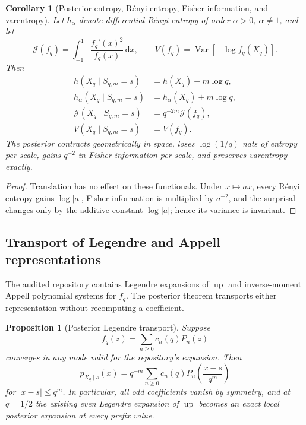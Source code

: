 \documentclass[11pt,oneside]{article}
\newtheorem{proposition}[theorem]{Proposition}
\newtheorem{corollary}[theorem]{Corollary}
\theoremstyle{definition}
\theoremstyle{remark}
\newcommand{\Var}{\operatorname{Var}}
\newcommand{\Up}{\operatorname{up}}
\newcommand{\dd}{\,\mathrm d}
\begin{document}
\begin{corollary}[Posterior entropy, R\'enyi entropy, Fisher information, and varentropy]
\label{cor:posterior-functionals}
Let $h_\alpha$ denote differential R\'enyi entropy of order $\alpha>0$,
$\alpha\ne1$, and let
\[
 \mathcal J(f_q)=\int_{-1}^{1}\frac{f_q'(x)^2}{f_q(x)}\dd x,
 \qquad
 V(f_q)=\Var[-\log f_q(X_q)].
\]
Then
\begin{align}
 h(X_q\mid S_{q,m}=s)&=h(X_q)+m\log q,\label{eq:post-h}\\
 h_\alpha(X_q\mid S_{q,m}=s)&=h_\alpha(X_q)+m\log q,\label{eq:post-renyi}\\
 \mathcal J(X_q\mid S_{q,m}=s)&=q^{-2m}\mathcal J(f_q),\label{eq:post-fisher}\\
 V(X_q\mid S_{q,m}=s)&=V(f_q).\label{eq:post-varentropy}
\end{align}
The posterior contracts geometrically in space, loses $\log(1/q)$ nats of entropy
per scale, gains $q^{-2}$ in Fisher information per scale, and preserves
varentropy exactly.
\end{corollary}

\begin{proof}
Translation has no effect on these functionals.  Under $x\mapsto ax$, every
R\'enyi entropy gains $\log|a|$, Fisher information is multiplied by $a^{-2}$,
and the surprisal changes only by the additive constant $\log|a|$; hence its
variance is invariant.
\end{proof}

\subsection{Transport of Legendre and Appell representations}

The audited repository contains Legendre expansions of $\Up$ and inverse-moment
Appell polynomial systems for $f_q$.  The posterior theorem transports either
representation without recomputing a coefficient.

\begin{proposition}[Posterior Legendre transport]
\label{prop:legendre-posterior}
Suppose
\begin{equation}
 f_q(z)=\sum_{n\ge0}c_n(q)P_n(z)
 \label{eq:legendre-fq}
\end{equation}
converges in any mode valid for the repository's expansion.  Then
\begin{equation}
 p_{X_q\mid s}(x)
 =q^{-m}\sum_{n\ge0}c_n(q)
 P_n\!\left(\frac{x-s}{q^m}\right)
 \label{eq:legendre-posterior}
\end{equation}
for $|x-s|\le q^m$.  In particular, all odd coefficients vanish by symmetry, and
at $q=1/2$ the existing even Legendre expansion of $\Up$ becomes an exact local
posterior expansion at every prefix value.
\end{proposition}
\end{document}
